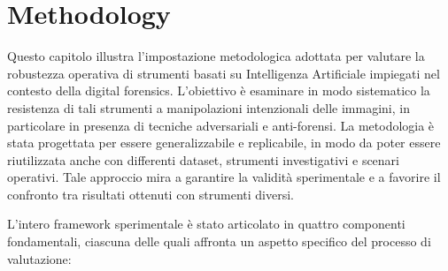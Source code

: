 \chapter{Methodology}	\label{chap:methodology}

Questo capitolo illustra l'impostazione metodologica adottata per valutare la robustezza operativa di strumenti basati su Intelligenza Artificiale impiegati nel contesto della digital forensics. L'obiettivo è esaminare in modo sistematico la resistenza di tali strumenti a manipolazioni intenzionali delle immagini, in particolare in presenza di tecniche adversariali e anti-forensi. La metodologia è stata progettata per essere generalizzabile e replicabile, in modo da poter essere riutilizzata anche con differenti dataset, strumenti investigativi e scenari operativi. Tale approccio mira a garantire la validità sperimentale e a favorire il confronto tra risultati ottenuti con strumenti diversi.

L'intero framework sperimentale è stato articolato in quattro componenti fondamentali, ciascuna delle quali affronta un aspetto specifico del processo di valutazione:

